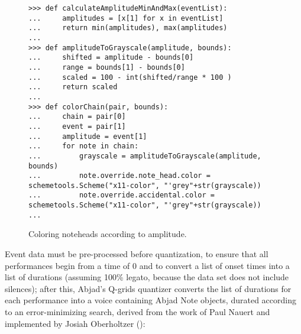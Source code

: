 \begin{figure}[H]
\begin{lstlisting}[basicstyle=\scriptsize\ttfamily, breaklines=True, tabsize=4, showtabs=false, showspaces=false]
>>> def calculateAmplitudeMinAndMax(eventList):
...     amplitudes = [x[1] for x in eventList]
...     return min(amplitudes), max(amplitudes)
... 
>>> def amplitudeToGrayscale(amplitude, bounds):
...     shifted = amplitude - bounds[0]
...     range = bounds[1] - bounds[0]
...     scaled = 100 - int(shifted/range * 100 )
...     return scaled
... 
>>> def colorChain(pair, bounds):
...     chain = pair[0]
...     event = pair[1]
...     amplitude = event[1]
...     for note in chain:
...         grayscale = amplitudeToGrayscale(amplitude, bounds)
...         note.override.note_head.color = schemetools.Scheme("x11-color", "'grey"+str(grayscale))
...         note.override.accidental.color = schemetools.Scheme("x11-color", "'grey"+str(grayscale))
... \end{lstlisting}

\caption{Coloring noteheads according to amplitude. } 
\end{figure}

Event data must be pre-processed before quantization, to ensure that all performances begin from a time of 0 and to convert a list of onset times into a list of durations (assuming 100\% legato, because the data set does not include silences); after this, Abjad's Q-grids quantizer converts the list of durations for each performance into a voice containing Abjad Note objects, durated according to an error-minimizing search, derived from the work of Paul Nauert and implemented by Josiah Oberholtzer (\cite{nauert1994theory}):

